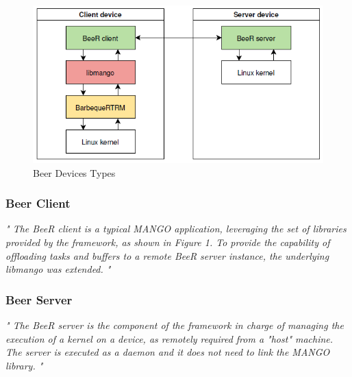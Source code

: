 \begin{figure}[h]
	\centering
	\includegraphics[scale=0.8]{Images/Diagrams/Beer_Devices}
	\caption{Beer Devices Types}
\end{figure}

\subsubsection{Beer Client}
\emph{" The BeeR client is a typical MANGO application, leveraging the set of libraries
	provided by the framework, as shown in Figure 1. To provide the capability
	of offloading tasks and buffers to a remote BeeR server instance, the underlying
	libmango was extended. "}

\subsubsection{Beer Server}
\emph{" The BeeR server is the component of the framework in charge of managing
	the execution of a kernel on a device, as remotely required from a "host"
	machine. The server is executed as a daemon and it does not need to link the
	MANGO library. "}

